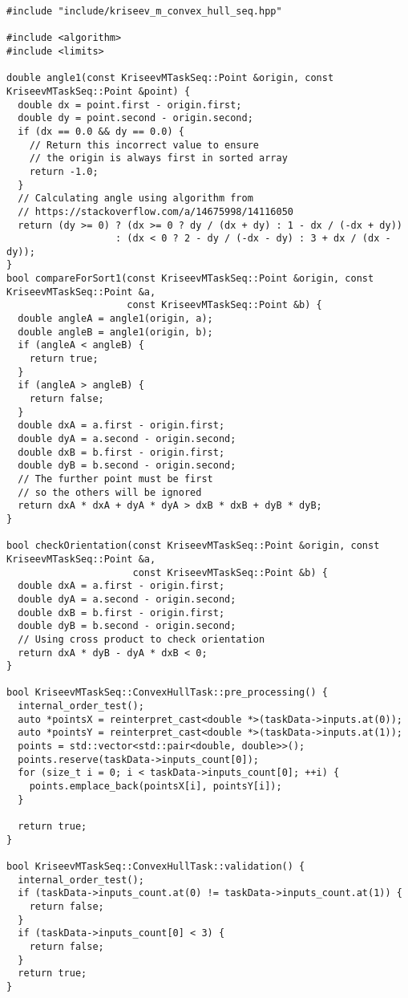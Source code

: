 \documentclass[a4paper]{article}
\begin{document}
\begin{lstlisting}
#include "include/kriseev_m_convex_hull_seq.hpp"

#include <algorithm>
#include <limits>

double angle1(const KriseevMTaskSeq::Point &origin, const KriseevMTaskSeq::Point &point) {
  double dx = point.first - origin.first;
  double dy = point.second - origin.second;
  if (dx == 0.0 && dy == 0.0) {
    // Return this incorrect value to ensure
    // the origin is always first in sorted array
    return -1.0;
  }
  // Calculating angle using algorithm from
  // https://stackoverflow.com/a/14675998/14116050
  return (dy >= 0) ? (dx >= 0 ? dy / (dx + dy) : 1 - dx / (-dx + dy))
                   : (dx < 0 ? 2 - dy / (-dx - dy) : 3 + dx / (dx - dy));
}
bool compareForSort1(const KriseevMTaskSeq::Point &origin, const KriseevMTaskSeq::Point &a,
                     const KriseevMTaskSeq::Point &b) {
  double angleA = angle1(origin, a);
  double angleB = angle1(origin, b);
  if (angleA < angleB) {
    return true;
  }
  if (angleA > angleB) {
    return false;
  }
  double dxA = a.first - origin.first;
  double dyA = a.second - origin.second;
  double dxB = b.first - origin.first;
  double dyB = b.second - origin.second;
  // The further point must be first
  // so the others will be ignored
  return dxA * dxA + dyA * dyA > dxB * dxB + dyB * dyB;
}

bool checkOrientation(const KriseevMTaskSeq::Point &origin, const KriseevMTaskSeq::Point &a,
                      const KriseevMTaskSeq::Point &b) {
  double dxA = a.first - origin.first;
  double dyA = a.second - origin.second;
  double dxB = b.first - origin.first;
  double dyB = b.second - origin.second;
  // Using cross product to check orientation
  return dxA * dyB - dyA * dxB < 0;
}

bool KriseevMTaskSeq::ConvexHullTask::pre_processing() {
  internal_order_test();
  auto *pointsX = reinterpret_cast<double *>(taskData->inputs.at(0));
  auto *pointsY = reinterpret_cast<double *>(taskData->inputs.at(1));
  points = std::vector<std::pair<double, double>>();
  points.reserve(taskData->inputs_count[0]);
  for (size_t i = 0; i < taskData->inputs_count[0]; ++i) {
    points.emplace_back(pointsX[i], pointsY[i]);
  }

  return true;
}

bool KriseevMTaskSeq::ConvexHullTask::validation() {
  internal_order_test();
  if (taskData->inputs_count.at(0) != taskData->inputs_count.at(1)) {
    return false;
  }
  if (taskData->inputs_count[0] < 3) {
    return false;
  }
  return true;
}


\end{lstlisting}
\end{document}
